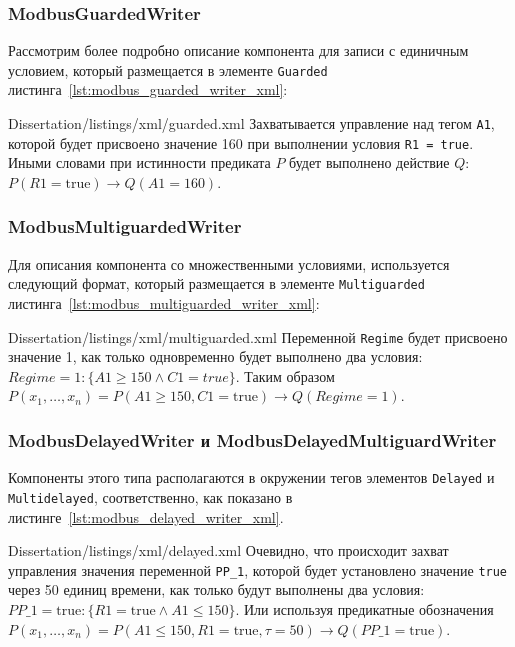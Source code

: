\subsubsection{ModbusGuardedWriter}
Рассмотрим более подробно описание компонента для записи с единичным условием,
который размещается в элементе \texttt{Guarded} листинга~\ref{lst:modbus_guarded_writer_xml}:

        {Dissertation/listings/xml/guarded.xml}
Захватывается управление над тегом \texttt{A1}, которой будет присвоено значение 160
при выполнении условия \texttt{R1 = true}.
Иными словами при истинности предиката $P$ будет выполнено действие $Q$:
$P(R1=\mbox{true}) \to Q(A1=160)$.


\subsubsection{ModbusMultiguardedWriter}
Для описания компонента со множественными условиями, используется следующий формат,
который размещается в элементе \texttt{Multiguarded} листинга~\ref{lst:modbus_multiguarded_writer_xml}:

        {Dissertation/listings/xml/multiguarded.xml}
Переменной \texttt{Regime} будет присвоено значение 1, как только 
одновременно будет выполнено два условия: $Regime = 1: \{A1 \ge 150 \wedge C1 = true\}$.
Таким образом $P(x_1,\ldots,x_n) = P(A1\ge150, C1=\mbox{true}) \to Q(Regime=1)$.

\subsubsection{ModbusDelayedWriter и ModbusDelayedMultiguardWriter}
Компоненты этого типа располагаются в окружении тегов элементов \texttt{Delayed} и \texttt{Multidelayed}, соответственно,
как показано в листинге~\ref{lst:modbus_delayed_writer_xml}.

        {Dissertation/listings/xml/delayed.xml}
Очевидно, что происходит захват управления значения переменной \texttt{PP\_1}, которой будет установлено значение \texttt{true}
через 50 единиц времени, как только будут выполнены два условия:
$PP\_1 = \mbox{true}: \{R1 = \mbox{true} \wedge A1 \le 150\}$.
Или используя предикатные обозначения
$P(x_1,\ldots,x_n) = P(A1\le150, R1=\mbox{true}, \tau=50) \to Q(PP\_1=\mbox{true})$.


